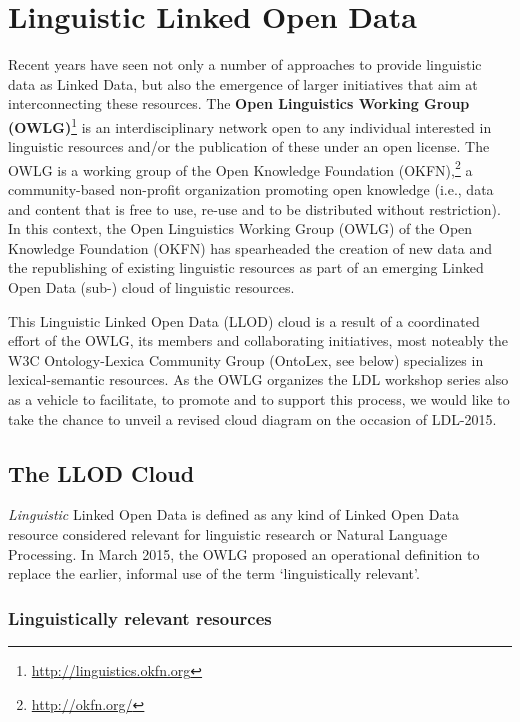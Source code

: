 \section{Linguistic Linked Open Data} %

Recent years have seen not only a number of approaches to provide linguistic data as Linked Data, but also the emergence of larger initiatives that aim at interconnecting these resources.
The \textbf{Open Linguistics Working Group (OWLG)}\footnote{\url{http://linguistics.okfn.org}} is an interdisciplinary network open to any individual interested in linguistic resources and/or the publication of these under an open license. The OWLG is a working group of the Open Knowledge Foundation (OKFN),\footnote{\url{http://okfn.org/}} a community-based non-profit organization promoting open knowledge (i.e., data and content that is free to use, re-use and to be distributed without restriction).
In this context, the Open Linguistics Working Group (OWLG) of the Open Knowledge Foundation (OKFN) has spearheaded the creation of 
new data and the republishing of existing linguistic resources as part of an emerging Linked Open Data (sub-) cloud of linguistic resources. 

This Linguistic Linked Open Data (LLOD) cloud is a result of a coordinated effort of the OWLG, its members and collaborating initiatives, most noteably the W3C Ontology-Lexica Community Group (OntoLex, see below) specializes in lexical-semantic resources.
As the OWLG organizes the LDL workshop series also as a vehicle to facilitate, to promote and to support this process, we would like to take the chance to unveil a revised cloud diagram on the occasion of LDL-2015.

\subsection{The LLOD Cloud}

\emph{Linguistic} Linked Open Data is defined as any kind of Linked Open Data resource considered relevant for linguistic research or Natural Language Processing. 
In March 2015, the OWLG proposed an operational definition to replace the earlier, informal use of the term `linguistically relevant'.

\subsubsection{Linguistically relevant resources}

